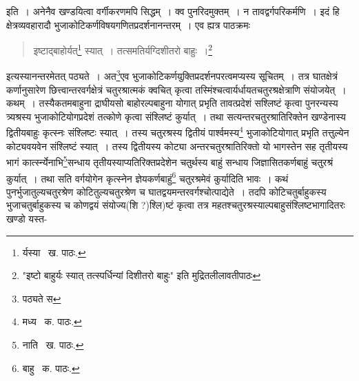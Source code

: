 \documentclass[11pt, openany]{book}
\begin{document}
\noindent इति~। अनेनैव खण्डयित्वा वर्गीकरणमपि सिद्धम्~। क्व पुनरिदमुक्तम्~। न तावद्वर्गपरिकर्मणि~। इदं हि क्षेत्रव्यवहारादौ भुजाकोटिकर्णविषयगणितप्रदर्शनानन्तरम्~। एव ह्यत्र पाठक्रमः\textendash

\begin{quote}
{\qt इष्टाद्बाहोर्यत्}\renewcommand{\thefootnote}{१}\footnote{र्यस्या \textendash\ ख. पाठः.} {\qt स्यात्~। तत्समतिर्यग्दिशीतरो बाहुः~।}\renewcommand{\thefootnote}{*}\footnote{"इष्टो बाहुर्यः स्यात् तत्स्पर्धिन्यां दिशीतरो बाहुः" इति मुद्रितलीलावतीपाठः}
\end{quote}

\noindent इत्यस्यानन्तरमेतत् पठ्यते~। अत\renewcommand{\thefootnote}{२}\footnote{पठ्यते स}एव भुजाकोटिकर्णयुक्तिप्रदर्शनपरत्वमप्यस्य सूचितम्~। तत्र घातक्षेत्रं कर्णानुसारेण छित्त्वान्तरवर्गक्षेत्रं
चतुरश्रात्मकं क्वचित् कृत्वा तस्मिंश्चत्वार्यर्धायतचतुरश्रक्षेत्राणि संयोजयेत्~। कथम्~। तस्यैकतमबाहुना द्राघीयसो बाहोरल्पबाहुना योगात् प्रभृति तावत्प्रदेशं सश्लिष्टं कृत्वा पुनरन्यस्य त्र्यश्रस्य भुजाकोटियोगप्रदेशं तत्कोणे कृत्वा संश्लिष्टं कुर्यात्~। तथा सत्यन्तरचतुरश्रातिरिक्तेन खण्डेनास्य द्वितीयबाहुः कृत्स्नः संश्लिष्टः स्यात्~। तस्य चतुरश्रस्य द्वितीयं पार्श्वमस्य\renewcommand{\thefootnote}{३}\footnote{मध्य \textendash\ क. पाठः.} भुजाकोटियोगात् प्रभृति तत्तुल्येन कोट्यवयवेन संश्लिष्टं स्यात्~। तस्य द्वितीयस्य कोट्या अन्तरचतुरश्रातिरिक्तो यो भागस्तेन सह तृतीयस्य भागं कार्त्स्न्येनाभि\renewcommand{\thefootnote}{४}\footnote{नाति \textendash\ ख. पाठः.}सन्धाय तृतीयस्याप्यतिरिक्तप्रदेशेन चतुर्थस्य बाहुं सन्धाय जिज्ञासितकर्णबाहुं चतुरश्रं कुर्यात्~। तथा सति वर्गयोगेन कृत्स्नेन ज्ञेयकर्णबाहुं\renewcommand{\thefootnote}{५}\footnote{बाहु \textendash\ क. पाठः.} चतुरश्रमेवं कुर्यादिति भावः~। कथं पुनर्भुजातुल्यचतुरश्रेण कोटितुल्यचतुरश्रेण च घातद्वयमन्तरवर्गश्चोत्पाद्येते~। तदपि कोटिचतुर्बाहुकस्य भुजाचतुर्बाहुकस्य च कोणद्वयं संयोज्य(शि ?)श्लि)ष्टं कृत्वा तत्र महतश्चतुरश्रस्याल्पबाहुसंश्लिष्टभागादितरः खण्डो यस्त-

\newpage
\end{document}
